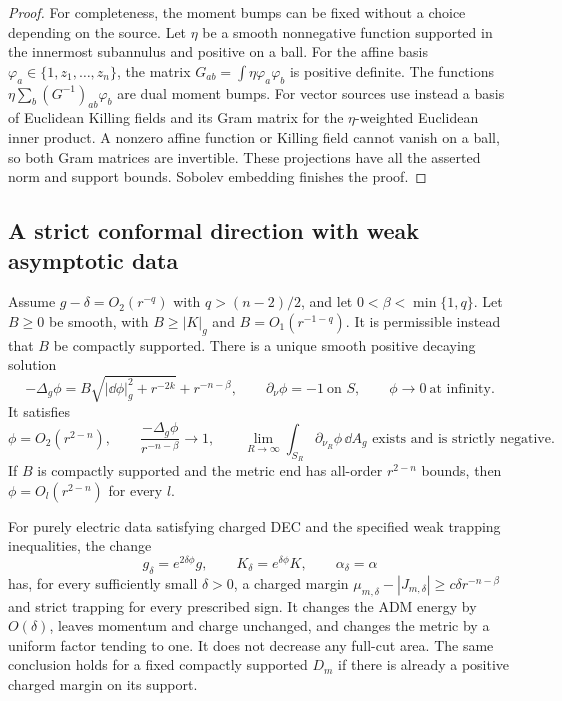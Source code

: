 \begin{proof}
For completeness, the moment bumps can be fixed without a choice
depending on the source.  Let $\eta$ be a smooth nonnegative function
supported in the innermost subannulus and positive on a ball.  For the
affine basis $\varphi_a\in\{1,z_1,\ldots,z_n\}$, the matrix
$G_{ab}=\int\eta\varphi_a\varphi_b$ is positive definite.  The functions
$\eta\sum_b(G^{-1})_{ab}\varphi_b$ are dual moment bumps.  For vector
sources use instead a basis of Euclidean Killing fields and its Gram
matrix for the $\eta$-weighted Euclidean inner product.  A nonzero
affine function or Killing field cannot vanish on a ball, so both Gram
matrices are invertible.  These projections have all the asserted norm
and support bounds.  Sobolev embedding finishes the proof.
\end{proof}

\subsection{A strict conformal direction with weak asymptotic data}

\begin{lemma}
\label{prep:strictification}
Assume $g-\delta=O_2(r^{-q})$ with $q>(n-2)/2$, and let
$0<\beta<\min\{1,q\}$.  Let $B\geq0$ be smooth, with
$B\geq|K|_g$ and $B=O_1(r^{-1-q})$.  It is permissible instead that
$B$ be compactly supported.  There is a unique smooth positive decaying
solution
\begin{equation}
 \label{prep:neumann-equation}
 -\Delta_g\phi
 =B\sqrt{|\dd\phi|_g^2+r^{-2k}}+r^{-n-\beta},
 \qquad \partial_\nu\phi=-1\ \text{on }S,
 \qquad \phi\longrightarrow0\ \text{at infinity}.
\end{equation}
It satisfies
\begin{equation}
 \label{prep:neumann-asymptotics}
 \phi=O_2(r^{2-n}),\qquad
 \frac{-\Delta_g\phi}{r^{-n-\beta}}\longrightarrow1,
 \qquad
 \lim_{R\to\infty}\int_{S_R}\partial_{\nu_R}\phi\,\dd A_g
 \text{ exists and is strictly negative}.
\end{equation}
If $B$ is compactly supported and the metric end has all-order
$r^{2-n}$ bounds, then $\phi=O_l(r^{2-n})$ for every $l$.

For purely electric data satisfying charged DEC and the specified weak
trapping inequalities, the change
\[
 g_\delta=e^{2\delta\phi}g,
 \qquad K_\delta=e^{\delta\phi}K,
 \qquad \alpha_\delta=\alpha
\]
has, for every sufficiently small $\delta>0$, a charged margin
$\mu_{m,\delta}-|J_{m,\delta}|\geq c\delta r^{-n-\beta}$ and strict
trapping for every prescribed sign.  It changes the ADM energy by
$O(\delta)$, leaves momentum and charge unchanged, and changes the
metric by a uniform factor tending to one.  It does not decrease any
full-cut area.  The same conclusion holds for a fixed compactly
supported $D_m$ if there is already a positive charged margin on its
support.
\end{lemma}

